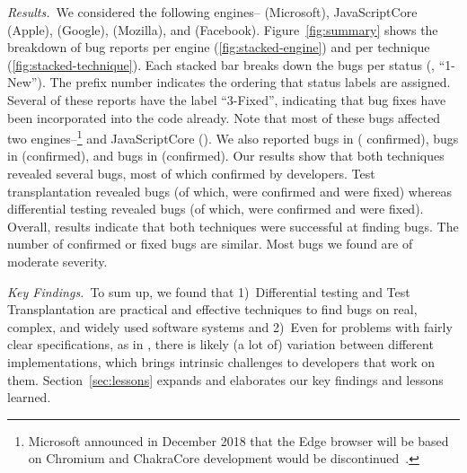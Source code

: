 \documentclass[smallextended]{svjour3}
\begin{document}
\sloppy \emph{Results.}~We considered the following engines--\chakra{}
(Microsoft), JavaScriptCore (Apple), \veight{} (Google), \smonkey{}
(Mozilla), and \hermes (Facebook). Figure~\ref{fig:summary} shows the
breakdown of bug reports per engine (\ref{fig:stacked-engine}) and per
technique (\ref{fig:stacked-technique}).  Each stacked bar breaks down
the bugs per status (\eg{}, ``1-New''). The prefix number indicates
the ordering that status labels are assigned. Several of these reports
have the label ``3-Fixed'', indicating that bug fixes have been
incorporated into the code already. Note that most of these bugs
affected two engines--\chakra{}\footnote{Microsoft announced in
  December 2018 that the Edge browser will be based on Chromium and
  ChakraCore development would be
  discontinued~\cite{chakra-discontinued}.} and JavaScriptCore (\jsc).
We also reported \noBugsBugsReportedGoogle{} bugs in \veight{}
(\noBugsBugsConfirmedGoogle{} confirmed), \noBugsBugsReportedHermes
bugs in \hermes (\noBugsBugsConfirmedHermes confirmed), and
\noBugsBugsReportedSMonkey bugs in \smonkey{}
(\noBugsBugsConfirmedSMonkey confirmed).  Our results show that both
techniques revealed several bugs, most of which confirmed by
developers. Test transplantation revealed \noBugsTransplantation bugs
(of which, \noBugsTransplantationConfirmed were confirmed and
\noBugsTransplantationFixed were fixed) whereas differential testing
revealed \noBugsDifferentialTesting bugs (of which,
\noBugsDifferentialTestingConfirmed were confirmed and
\noBugsDifferentialTestingFixed were fixed).  Overall, results
indicate that both techniques were successful at finding bugs. The
number of confirmed or fixed bugs are similar. Most bugs we found are
of moderate severity.



\emph{Key Findings.}~To sum up, we found that 1)~Differential testing
and Test Transplantation are practical and effective techniques to
find bugs on real, complex, and widely used software systems and
2)~Even for problems with fairly clear specifications, as in
\javascript{}, there is likely (a lot of) variation between different
implementations, which brings intrinsic challenges to developers that
work on them.  Section~\ref{sec:lessons} expands and elaborates our
key findings and lessons learned.
\end{document}
